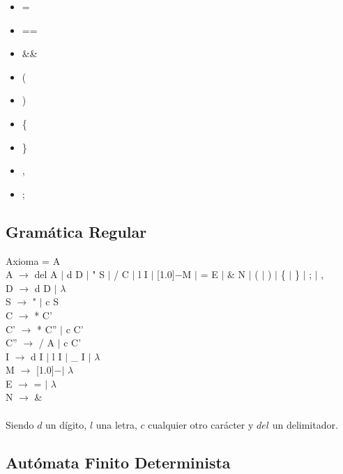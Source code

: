 \documentclass[11pt, , a4paper, titlepage]{article}
\newenvironment{myitemize}
{ \begin{itemize}
    \setlength{\itemsep}{0pt}
    \setlength{\parskip}{2pt}    }
{ \end{itemize}                  }
\newcommand{\minus}{\scalebox{0.75}[1.0]{$-$}}
\newenvironment{changemargin}[2]{%
\begin{list}{}{%
\setlength{\topsep}{0pt}%
\setlength{\leftmargin}{#1}%
\setlength{\rightmargin}{#2}%
\setlength{\listparindent}{\parindent}%
\setlength{\itemindent}{\parindent}%
\setlength{\parsep}{\parskip}%
}%
\item[]}{\end{list}}
\begin{document}
\begin{changemargin}{0cm}{+4cm}
\begin{flushleft}
\begin{myitemize}
            \item =
            \item == 
            \item \&\& 
            \item ( 
                  \item ) 
            \item \{ 
            \item \} 
            \item , 
            \item ; 
        \end{myitemize}
    \end{flushleft}
\end{changemargin}
\clearpage

\subsection{Gramática Regular}
\noindent
Axioma = A\\
A $\rightarrow$ del A $|$ d D $|$ " \hspace{1mm} S $|$ / C $|$ l I $|$ \minus  M $|$ = E $|$ \& N $|$ ( $|$ ) $|$ \{ $|$ \} $|$ ; $|$ , \\
D $\rightarrow$ d D $|$ $\lambda$\\
S $\rightarrow$ " \hspace{1mm} $|$ c S\\
C $\rightarrow$ * C'\\
C' $\rightarrow$ * C'' $|$ c C'\\
C'' $\rightarrow$ / A $|$ c C'\\
I $\rightarrow$ d I $|$ l I $|$ \_ I $|$ $\lambda$\\
M $\rightarrow$ \minus \hspace{1.5mm}$|$ $\lambda$\\
E $\rightarrow$ = $|$ $\lambda$\\
N $\rightarrow$ \&\\
\\
Siendo $d$ un dígito, $l$ una letra, $c$ cualquier otro carácter y $del$ un delimitador.

\subsection{Autómata Finito Determinista}
\begin{center}
\end{center}
\clearpage
\end{document}
